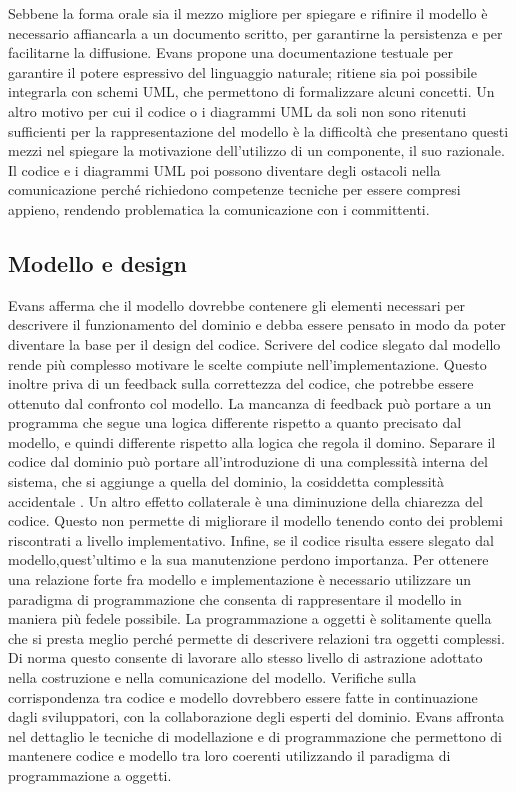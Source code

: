 \documentclass[12pt]{report}
\begin{document}
Sebbene la forma orale sia il mezzo migliore per spiegare e rifinire il modello è necessario affiancarla a un documento scritto, per garantirne la persistenza e per facilitarne la diffusione.
Evans propone una documentazione testuale per garantire il potere espressivo del linguaggio naturale; ritiene sia poi possibile integrarla con schemi UML, che permettono di formalizzare alcuni concetti.
Un altro motivo per cui il codice o i diagrammi UML da soli non sono ritenuti sufficienti per la rappresentazione del modello è la difficoltà che presentano questi mezzi nel spiegare la motivazione dell'utilizzo di un componente, il suo razionale.  
Il codice e i diagrammi UML poi possono diventare degli ostacoli nella comunicazione perché richiedono competenze tecniche per essere compresi appieno, rendendo problematica la comunicazione con i committenti.

\subsection{Modello e design}

Evans afferma che il modello dovrebbe contenere gli elementi necessari per descrivere il funzionamento del dominio e debba essere pensato in modo da poter diventare la base per il design del codice.
Scrivere del codice slegato dal modello rende più complesso motivare le scelte compiute nell'implementazione. 
Questo inoltre priva di un feedback sulla correttezza del codice, che potrebbe essere ottenuto dal confronto col modello.
La mancanza di feedback può portare a un programma che segue una logica differente rispetto a quanto precisato dal modello, e quindi differente rispetto alla logica che regola il domino.
Separare il codice dal dominio può portare all'introduzione di una complessità interna del sistema, che si aggiunge a quella del dominio, la cosiddetta complessità accidentale \cite{brooks_no_1987}. 
Un altro effetto collaterale è una diminuzione della chiarezza del codice.
Questo non permette di migliorare il modello tenendo conto dei problemi riscontrati a livello implementativo. 
Infine, se il codice risulta essere slegato dal modello,quest'ultimo e la sua manutenzione perdono importanza. 
Per ottenere una relazione forte fra modello e implementazione è necessario utilizzare un paradigma di programmazione che consenta di rappresentare il modello in maniera più fedele possibile. 
La programmazione a oggetti è solitamente quella che si presta meglio perché permette di descrivere relazioni tra oggetti complessi. 
Di norma questo consente di lavorare allo stesso livello di astrazione adottato nella costruzione e nella comunicazione del modello.
Verifiche sulla corrispondenza tra codice e modello dovrebbero essere fatte in continuazione dagli sviluppatori, con la collaborazione degli esperti del dominio.
Evans affronta nel dettaglio le tecniche di modellazione e di programmazione che permettono di mantenere codice e modello tra loro coerenti utilizzando il paradigma di programmazione a oggetti.
\end{document}
